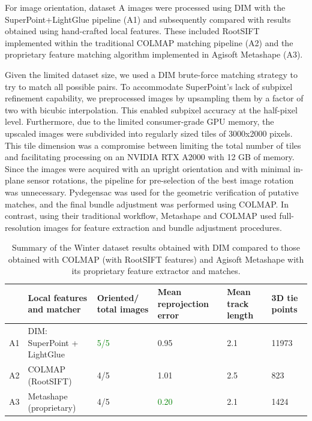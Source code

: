 For image orientation, dataset A images were processed using DIM with the SuperPoint+LightGlue pipeline (A1) and subsequently compared with results obtained using hand-crafted local features.  
These included RootSIFT implemented within the traditional COLMAP matching pipeline (A2) and the proprietary feature matching algorithm implemented in Agisoft Metashape (A3).

Given the limited dataset size, we used a DIM brute-force matching strategy to try to match all possible pairs. 
To accommodate SuperPoint's lack of subpixel refinement capability, we preprocessed images by upsampling them by a factor of two with bicubic interpolation. 
This enabled subpixel accuracy at the half-pixel level. 
Furthermore, due to the limited consumer-grade GPU memory, the upscaled images were subdivided into regularly sized tiles of 3000x2000 pixels.  
This tile dimension was a compromise between limiting the total number of tiles and facilitating processing on an NVIDIA RTX A2000 with 12 GB of memory. 
Since the images were acquired with an upright orientation and with minimal in-plane sensor rotations, the pipeline for pre-selection of the best image rotation was unnecessary.  
Pydegensac was used for the geometric verification of putative matches, and the final bundle adjustment was performed using COLMAP. 
In contrast, using their traditional workflow, Metashape and COLMAP used full-resolution images for feature extraction and bundle adjustment procedures.

\begin{table}
    \centering
    \caption{Summary of the Winter dataset results obtained with DIM compared to those obtained with COLMAP (with RootSIFT features) and Agisoft Metashape with its proprietary feature extractor and matches.} 
    \label{tab:5:winter_statistics}
    
    \begin{tabular}{l p{3.5cm} p{2.2cm} p{2.2cm} p{2.2cm} p{2.2cm}}
    \toprule
    &Local features \newline and matcher & Oriented/ \newline total images & Mean reprojection error \newline [px] & Mean track \newline length &  3D tie points\\
    \midrule
    A1 &DIM: SuperPoint \newline + LightGlue           & \textcolor{green}{5/5}     & 0.95 & 2.1  & 11973 \\
    A2 &COLMAP \newline (RootSIFT)                     & 4/5      & 1.01    & 2.5    & 823   \\
    A3 &Metashape \newline(proprietary)               & 4/5     & \textcolor{green}{0.20}  & 2.1   & 1424 \\
    \bottomrule
    \end{tabular}
\end{table}

